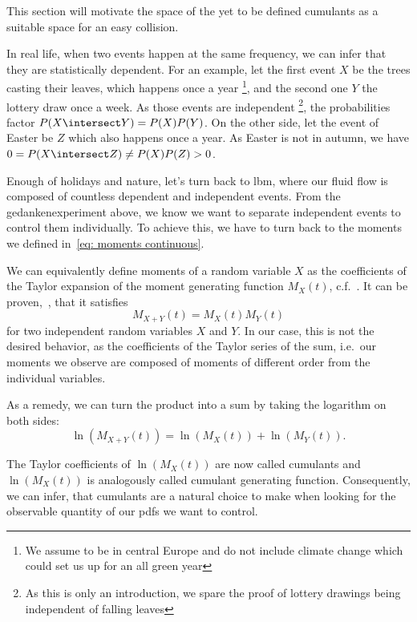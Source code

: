 
This section will motivate the space of the yet to be defined cumulants as a suitable space for an easy collision.

In real life, when two events happen at the same frequency, we can infer that they are statistically dependent.
For an example, let the first event $X$ be the trees casting their leaves, which happens once a year
\footnote{We assume to be in central Europe and do not include climate change which could set us up for an all green year},
and the second one $Y$ the lottery draw once a week.
As those events are independent
\footnote{As this is only an introduction, we spare the proof of lottery drawings being independent of falling leaves},
the probabilities factor $P(X\intersect Y) = P(X)P(Y)$.
On the other side, let the event of Easter be $Z$ which also happens once a year.
As Easter is not in autumn, we have $0 = P(X\intersect Z) \neq P(X)P(Z) > 0$.

Enough of holidays and nature, let's turn back to \gls{lbm}, where our fluid flow is composed of countless dependent and independent events.
From the gedankenexperiment above, we know we want to separate independent events to control them individually.
To achieve this, we have to turn back to the moments we defined in~\eqref{eq: moments continuous}.

We can equivalently define moments of a random variable $X$ as the coefficients of the Taylor expansion of the moment generating function $M_X(t)$, c.f.~\cite{weissteinMGF}.
It can be proven,~\cite{weissteinMGF}, that it satisfies
\begin{equation}
\label{eq: moment generating function for independent variables}
  M_{X+Y}(t) = M_{X}(t)M_{Y}(t)
\end{equation}
for two independent random variables $X$ and $Y$.
In our case, this is not the desired behavior, as the coefficients of the Taylor series of the sum, i.e.\ our moments we observe are composed of moments of different order from the individual variables.

As a remedy, we can turn the product into a sum by taking the logarithm on both sides:
\begin{equation}
  \label{eq: cumulant generating function for independent variables}
  \ln(M_{X+Y}(t)) = \ln(M_{X}(t)) + \ln(M_{Y}(t)).
\end{equation}

The Taylor coefficients of $\ln(M_X(t))$ are now called cumulants and $\ln(M_{X}(t))$ is analogously called cumulant generating function.
Consequently, we can infer, that cumulants are a natural choice to make when looking for the observable quantity of our \glspl{pdf} we want to control.

